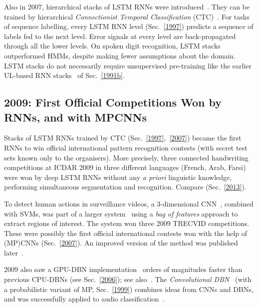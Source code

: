 \documentclass[letterpaper]{article}
\begin{document}
\begin{CJK*}{UTF8}{gbsn}
Also in 2007, 
hierarchical stacks of LSTM RNNs were introduced~\citep{Santi:07ijcai}. They can be 
trained by hierarchical {\em Connectionist Temporal Classification} (CTC)~\citep{Graves:06icml}. 
For tasks of sequence labelling, 
every LSTM RNN level (Sec.~\ref{1997}) predicts a sequence of labels fed to the next level. 
Error signals at every level are back-propagated through all the
lower levels. On spoken digit recognition, LSTM stacks
outperformed HMMs, despite making fewer assumptions about the domain.
LSTM stacks do not necessarily require unsupervised pre-training
like the earlier UL-based RNN stacks~\citep{chunker91and92} of Sec.~\ref{1991b}.



\subsection{2009: First Official Competitions Won by RNNs, and with MPCNNs}
\label{2009}

Stacks  of LSTM RNNs trained by CTC (Sec.~\ref{1997},~\ref{2007})
 became
the first   RNNs  to win
official international pattern recognition contests (with secret test sets known
only to the organisers). More precisely,
three connected handwriting competitions at ICDAR 2009 in three different languages 
(French, Arab, Farsi) were won by deep
LSTM RNNs without any {\em a priori} linguistic knowledge,
performing simultaneous segmentation and recognition.
Compare
\citep{graves05nn,Graves:09tpami,schmidhuber2011agi,graves:2013icassp,graves2014} (Sec.~\ref{2013}).


To detect human actions in surveillance videos,
a 3-dimensional CNN~\citep[e.g.,][]{seung2009,prokhorov2010}, combined with SVMs, was part of a larger 
system~\citep{trecvid2009}
using a {\em bag of features} approach \citep{nowak2006}
to extract regions of interest.
The system won three 2009 TRECVID competitions.
These were possibly the first official international contests won with the help of (MP)CNNs (Sec.~\ref{2007}).
An improved version of the method was published later~\citep{ji2013}.

2009 also saw a GPU-DBN 
implementation~\citep{raina2009large} orders of magnitudes faster than previous CPU-DBNs
(see Sec.~\ref{2006}); see also~\citep{coates:2013icml}.
The {\em Convolutional DBN}~\citep{lee:2009} (with a probabilistic 
variant of MP, Sec.~\ref{1999})
combines ideas from CNNs and DBNs,
and was successfully applied to audio classification~\citep{lee2009audio}.






\end{CJK*}
\end{document}
